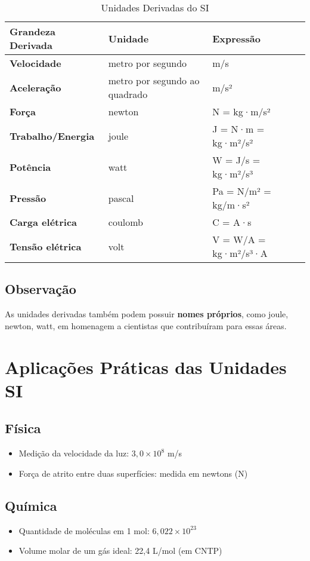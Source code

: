 \documentclass[portuguese,11pt,a4paper,oneside,onecolumn,notitlepage]{article}
\begin{document}
	\begin{table}[H]
		\centering
		\begin{tabular}{>{\bfseries}l l l}
			\toprule
			Grandeza Derivada & Unidade & Expressão \\
			\midrule
			Velocidade & metro por segundo & m/s \\
			Aceleração & metro por segundo ao quadrado & m/s² \\
			Força & newton & N = kg·m/s² \\
			Trabalho/Energia & joule & J = N·m = kg·m²/s² \\
			Potência & watt & W = J/s = kg·m²/s³ \\
			Pressão & pascal & Pa = N/m² = kg/m·s² \\
			Carga elétrica & coulomb & C = A·s \\
			Tensão elétrica & volt & V = W/A = kg·m²/s³·A \\
			\bottomrule
		\end{tabular}
		\caption{Unidades Derivadas do SI}
	\end{table}
	
	\subsection*{Observação}
	As unidades derivadas também podem possuir \textbf{nomes próprios}, como joule, newton, watt, em homenagem a cientistas que contribuíram para essas áreas.
	
	\section{Aplicações Práticas das Unidades SI}
	
	\subsection*{Física}
	\begin{itemize}
		\item Medição da velocidade da luz: $3{,}0 \times 10^8$ m/s
		\item Força de atrito entre duas superfícies: medida em newtons (N)
	\end{itemize}
	
	\subsection*{Química}
	\begin{itemize}
		\item Quantidade de moléculas em 1 mol: $6{,}022 \times 10^{23}$
		\item Volume molar de um gás ideal: 22{,}4 L/mol (em CNTP)
	\end{itemize}
	
\end{document}
